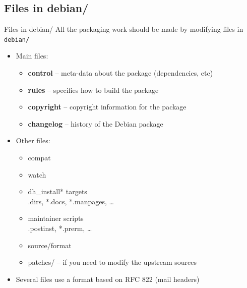 \documentclass[10pt,final]{beamer}
\begin{document}
\subsection{Files in debian/}
\begin{frame}{Files in debian/}
  All the packaging work should be made by modifying files in \texttt{debian/}
  \hbr
  \begin{itemize}
  \item Main files:
    \begin{itemize}
    \item \textbf{control} -- meta-data about the package (dependencies, etc)
    \item \textbf{rules} -- specifies how to build the package
    \item \textbf{copyright} -- copyright information for the package
    \item \textbf{changelog} -- history of the Debian package
    \end{itemize}
    \hbr
  \item Other files:
    \begin{itemize}
    \item compat
    \item watch
    \item dh\_install* targets\\
      {\small *.dirs, *.docs, *.manpages, \ldots}
    \item maintainer scripts\\
      {\small *.postinst, *.prerm, \ldots}
    \item source/format
    \item patches/ -- if you need to modify the upstream sources
    \end{itemize}
    \hbr
  \item Several files use a format based on RFC 822 (mail headers)
  \end{itemize}
\end{frame}
\end{document}
